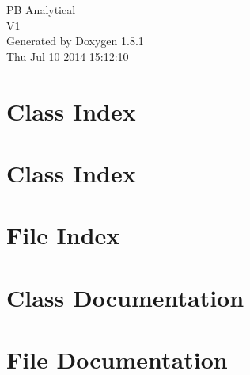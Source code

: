 \documentclass{book}
\begin{document}
\hypersetup{pageanchor=false,citecolor=blue}
\begin{titlepage}
\vspace*{7cm}
\begin{center}
{\Large P\-B Analytical \\[1ex]\large V1 }\\
\vspace*{1cm}
{\large Generated by Doxygen 1.8.1}\\
\vspace*{0.5cm}
{\small Thu Jul 10 2014 15:12:10}\\
\end{center}
\end{titlepage}
\clearemptydoublepage
{}
\tableofcontents
\clearemptydoublepage
{}
\hypersetup{pageanchor=true,citecolor=blue}
\chapter{Class Index}

\chapter{Class Index}

\chapter{File Index}

\chapter{Class Documentation}

















\chapter{File Documentation}

























\printindex
\end{document}

